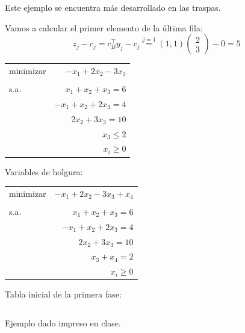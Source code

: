 \begin{example}
Este ejemplo se encuentra más desarrollado en las traspas.

\begin{ioprob}
\end{ioprob}

Vamos a calcular el primer elemento de la última fila:
\[z_j - c_j = c^\top_By_j - c_j \overset{j=1}{=} (1,1)\begin{pmatrix}2\\3\end{pmatrix}-0 = 5\]
\end{example}


\begin{example}

\begin{center}
\begin{tabular}{lr}
minimizar & $-x_1 + 2x_2 -3x_3$ \\
	 &  \\
s.a. & $x_1+x_2+x_3 =6 $    \\
	 & $-x_1 + x_2 + 2x_3  = 4$  \\
	 & $2x_2 + 3x_3  = 10$  \\
	 & $x_3  \leq 2$  \\
	 & $x_i\geq 0$
\end{tabular}
\end{center}

Variables de holgura:
\begin{center}
\begin{tabular}{lr}
minimizar & $-x_1 + 2x_2 -3x_3 + x_4$ \\
	 &  \\
s.a. & $x_1+x_2+x_3 =6 $    \\
	 & $-x_1 + x_2 + 2x_3  = 4$  \\
	 & $2x_2 + 3x_3  = 10$  \\
	 & $x_3 + x_4  = 2$  \\
	 & $x_i\geq 0$
\end{tabular}
\end{center}


Tabla inicial de la primera fase:

\begin{tabular}{ccccc}
\end{tabular}
\end{example}

\begin{example}
Ejemplo dado impreso en clase.
\end{example}


